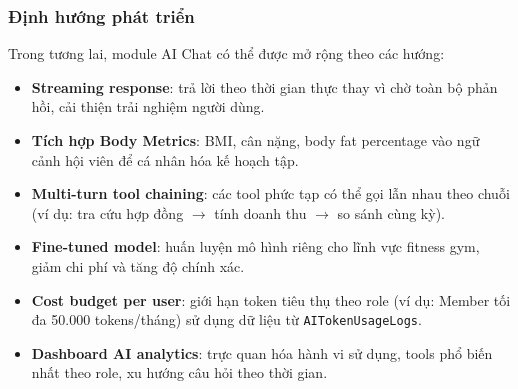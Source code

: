 \subsubsection{Định hướng phát triển}

Trong tương lai, module AI Chat có thể được mở rộng theo các hướng:

\begin{itemize}
    \item \textbf{Streaming response}: trả lời theo thời gian thực thay vì chờ toàn bộ phản hồi, cải thiện trải nghiệm người dùng.

    \item \textbf{Tích hợp Body Metrics}: BMI, cân nặng, body fat percentage vào ngữ cảnh hội viên để cá nhân hóa kế hoạch tập.

    \item \textbf{Multi-turn tool chaining}: các tool phức tạp có thể gọi lẫn nhau theo chuỗi (ví dụ: tra cứu hợp đồng $\to$ tính doanh thu $\to$ so sánh cùng kỳ).

    \item \textbf{Fine-tuned model}: huấn luyện mô hình riêng cho lĩnh vực fitness gym, giảm chi phí và tăng độ chính xác.

    \item \textbf{Cost budget per user}: giới hạn token tiêu thụ theo role (ví dụ: Member tối đa 50.000 tokens/tháng) sử dụng dữ liệu từ \texttt{AITokenUsageLogs}.

    \item \textbf{Dashboard AI analytics}: trực quan hóa hành vi sử dụng, tools phổ biến nhất theo role, xu hướng câu hỏi theo thời gian.
\end{itemize}

